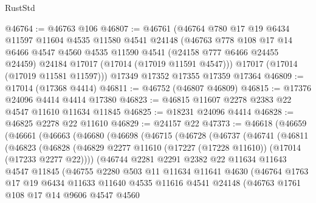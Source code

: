 \begin{lexlean}{RustStd}
\begin{coremodule}
{\begin{coremodule}
{{{{{{{{{{{{{{{{{{{{{{{{{{{{{{{{{{{{{{{{{{{{{{{{{{{{{{{@46764 := @46763 @106
@46807 := @46761
    (@46764
      @780
      @17
      @19
      @6434
      @11597
      @11604
      @4535
      @11580
      @4541
      @24148
      (@46763
        @778
        @108
        @17
        @14
        @6466
        @4547
        @4560
        @4535
        @11590
        @4541
        (@24158 @777 @6466 @24455 @24459)
        @24184
        @17017
        (@17014 (@17019 @11591 @4547)))
      @17017
      (@17014 (@17019 @11581 @11597)))
    @17349
    @17352
    @17355
    @17359
    @17364
@46809 := @17014 (@17368 @4414)
@46811 := @46752 (@46807 @46809)
@46815 := @17376 @24096 @4414 @4414 @17380
@46823 := @46815 @11607 @2278 @2383 @22 @4547 @11610 @11634 @11845
@46825 := @18231 @24096 @4414
@46828 := @46825 @2278 @22 @11610
@46829 := @24157 @22
@47373 := @46618
    (@46659
      (@46661
        (@46663
          (@46680
            (@46698
              (@46715
                (@46728
                  (@46737
                    (@46741
                      (@46811
                        (@46823
                          (@46828
                            (@46829
                              @2277
                              @11610
                              (@17227 (@17228 @11610))
                              (@17014 (@17233 @2277 @22))))
                          (@46744
                            @2281
                            @2291
                            @2382
                            @22
                            @11634
                            @11643
                            @4547
                            @11845
                            (@46755
                              @2280
                              @503
                              @11
                              @11634
                              @11641
                              @4630
                              (@46764
                                @1763
                                @17
                                @19
                                @6434
                                @11633
                                @11640
                                @4535
                                @11616
                                @4541
                                @24148
                                (@46763
                                  @1761
                                  @108
                                  @17
                                  @14
                                  @9606
                                  @4547
                                  @4560
}}}}}}}}}}}}}}}}}}}}}}}}}}}}}}}}}}}}}}}}}}}}}}}}}}}}}}}
\end{coremodule}}
\end{coremodule}
\end{lexlean}

